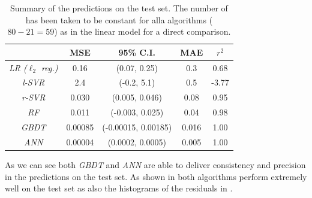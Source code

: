\begin{table}[htbp]
  \centering
  \begin{tabular}{@{}ccccc@{}}
  \toprule
                            & \textbf{MSE} & \textbf{95\% C.I.}  & \textbf{MAE} & $r^2$ \\
  \midrule
  \emph{LR ($\ell_2$ reg.)} & 0.16         & (0.07, 0.25)        & 0.3          & 0.68        \\
  \emph{l-SVR}              & 2.4          & (-0.2, 5.1)         & 0.5          & -3.77       \\
  \emph{r-SVR}              & 0.030        & (0.005, 0.046)      & 0.08         & 0.95        \\
  \emph{RF}                 & 0.011        & (-0.003, 0.025)     & 0.04         & 0.98        \\
  \emph{GBDT}               & 0.00085      & (-0.00015, 0.00185) & 0.016        & 1.00        \\
  \emph{ANN}                & 0.00004      & (0.0002, 0.0005)    & 0.005        & 1.00        \\
  \bottomrule
  \end{tabular}%
  \caption{%
    Summary of the predictions on the test set.
    The number of \dof has been taken to be constant for alla algorithms ($80 - 21 = 59$) as in the linear model for a direct comparison.
  }
  \label{tab:lumps:preds}
\end{table}

As we can see both \emph{GBDT} and \emph{ANN} are able to deliver consistency and precision in the predictions on the test set.
As shown in  both algorithms perform extremely well on the test set as also the histograms of the residuals in .

